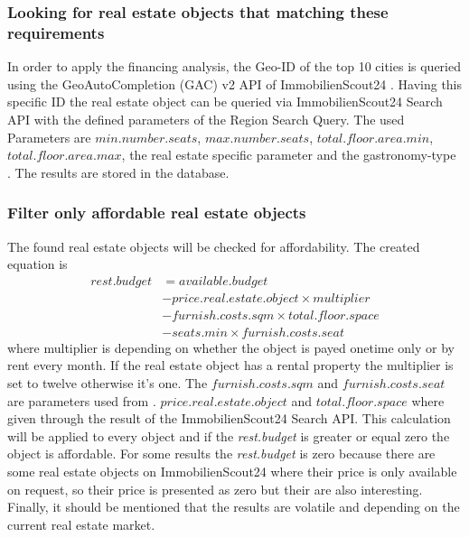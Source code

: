\subsubsection{Looking for real estate objects that matching these requirements}
In order to apply the financing analysis, the Geo-ID of the top 10 cities is queried using the GeoAutoCompletion (GAC)
 v2 \ac{API} of ImmobilienScout24 \cite{ImmoScout}. Having this specific ID the real estate object can be queried via ImmobilienScout24 Search \ac{API}
 with the defined parameters of the Region Search Query. The used Parameters are $min.number.seats$,
 $max.number.seats$, $total.floor.area.min$, $total.floor.area.max$, the real estate specific parameter
  and the gastronomy-type . The results are stored in the \pg{} database.
\subsubsection{Filter only affordable real estate objects}
The found real estate objects will be checked for affordability. The created equation is
    \begin{equation}
        \begin{aligned}
            rest.budget & = available.budget \\
                & - price.real.estate.object \times multiplier \\
                & - furnish.costs.sqm \times total.floor.space \\
                & - seats.min \times furnish.costs.seat
        \end{aligned}
        \label{eq:affordable}
    \end{equation}
where multiplier is depending on whether the object is payed onetime only or by rent every month. If the real estate
 object has a rental property the multiplier is set to twelve otherwise it's one. The $furnish.costs.sqm$ and
 $furnish.costs.seat$ are parameters used from \cite{BenchmarkGastronomie}. $price.real.estate.object$ and
 $total.floor.space$ where given through the result of the ImmobilienScout24 Search \ac{API}.\newline
 This calculation will be applied to
 every object and if the \textit{rest.budget} is greater or equal zero the object is affordable. For some results the
 \textit{rest.budget} is zero because there are some real estate objects on ImmobilienScout24 where their
 price is only available on request, so their price is presented as zero but their are also interesting.
\newline
Finally, it should be mentioned that the results are volatile and depending on the current real estate market.

